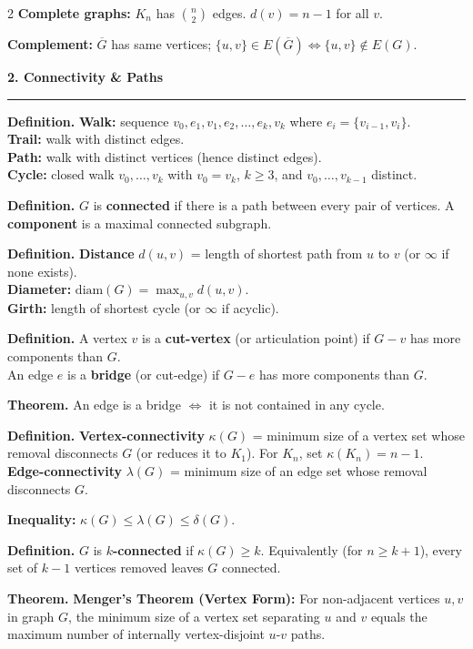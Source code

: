 \documentclass[8pt,landscape,a4paper]{extarticle}
\newcommand{\thm}[1]{\begin{mdframed}[style=theorembox]\textbf{Theorem.} #1\end{mdframed}}
\newcommand{\defn}[1]{\begin{mdframed}[style=defbox]\textbf{Definition.} #1\end{mdframed}}
\newcommand{\heading}[1]{\vspace{1pt}\noindent\textbf{\large #1}\vspace{1pt}\hrule\vspace{2pt}}
\begin{document}
\begin{multicols}{2}
\textbf{Complete graphs:} $K_n$ has $\binom{n}{2}$ edges. $d(v) = n-1$ for all $v$.

\textbf{Complement:} $\overline{G}$ has same vertices; $\{u,v\} \in E(\overline{G}) \iff \{u,v\} \notin E(G)$.

\heading{2. Connectivity \& Paths}

\defn{\textbf{Walk:} sequence $v_0, e_1, v_1, e_2, \ldots, e_k, v_k$ where $e_i = \{v_{i-1}, v_i\}$.\\
\textbf{Trail:} walk with distinct edges.\\
\textbf{Path:} walk with distinct vertices (hence distinct edges).\\
\textbf{Cycle:} closed walk $v_0, \ldots, v_k$ with $v_0 = v_k$, $k \geq 3$, and $v_0, \ldots, v_{k-1}$ distinct.}

\defn{$G$ is \textbf{connected} if there is a path between every pair of vertices. A \textbf{component} is a maximal connected subgraph.}

\defn{\textbf{Distance} $d(u,v)$ = length of shortest path from $u$ to $v$ (or $\infty$ if none exists).\\
\textbf{Diameter:} $\text{diam}(G) = \max_{u,v} d(u,v)$.\\
\textbf{Girth:} length of shortest cycle (or $\infty$ if acyclic).}

\defn{A vertex $v$ is a \textbf{cut-vertex} (or articulation point) if $G - v$ has more components than $G$.\\
An edge $e$ is a \textbf{bridge} (or cut-edge) if $G - e$ has more components than $G$.}

\thm{An edge is a bridge $\iff$ it is not contained in any cycle.}

\defn{\textbf{Vertex-connectivity} $\kappa(G)$ = minimum size of a vertex set whose removal disconnects $G$ (or reduces it to $K_1$). For $K_n$, set $\kappa(K_n) = n-1$.\\
\textbf{Edge-connectivity} $\lambda(G)$ = minimum size of an edge set whose removal disconnects $G$.}

\textbf{Inequality:} $\kappa(G) \leq \lambda(G) \leq \delta(G)$.

\defn{$G$ is \textbf{$k$-connected} if $\kappa(G) \geq k$. Equivalently (for $n \geq k+1$), every set of $k-1$ vertices removed leaves $G$ connected.}

\thm{\textbf{Menger's Theorem (Vertex Form):} For non-adjacent vertices $u,v$ in graph $G$, the minimum size of a vertex set separating $u$ and $v$ equals the maximum number of internally vertex-disjoint $u$-$v$ paths.}


\end{multicols}
\end{document}
